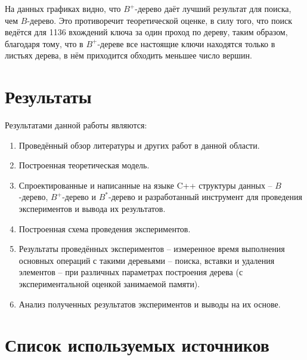 \documentclass{llncs}
\begin{document}
    На данных графиках видно, что $B^+$-дерево даёт лучший результат для поиска, чем $B$-дерево. Это противоречит теоретической оценке, в силу того, что поиск ведётся для 1136 вхождений ключа за один проход по дереву, таким образом, благодаря тому, что в $B^+$-дереве все настоящие ключи находятся только в листьях дерева, в нём приходится обходить меньшее число вершин.
    
    \section{Результаты}
    
    Результатами данной работы являются:
    
    \begin{enumerate}
    	\item Проведённый обзор литературы и других работ в данной области.
    	\item Построенная теоретическая модель.
    	\item Спроектированные и написанные на языке C++ структуры данных – $B$-дерево, $B^+$-дерево и $B^*$-дерево и разработанный инструмент для проведения экспериментов и вывода их результатов.
    	\item Построенная схема проведения экспериментов.
    	\item Результаты проведённых экспериментов – измеренное время выполнения основных операций с такими деревьями – поиска, вставки и удаления элементов – при различных параметрах построения дерева (с экспериментальной оценкой занимаемой памяти).
    	\item Анализ полученных результатов экспериментов и выводы на их основе.
    \end{enumerate}
    
    \vspace{-1em}
	
	\section{Список используемых источников}
	
\end{document}
